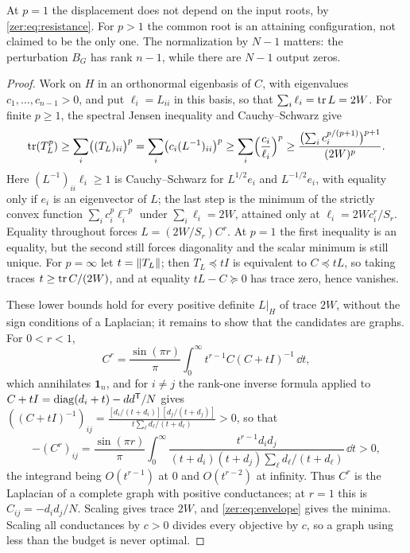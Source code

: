 At $p=1$ the displacement does not depend on the input roots, by \eqref{zer:eq:resistance}. For
$p>1$ the common root is an attaining configuration, not claimed to be the only one. The
normalization by $N-1$ matters: the perturbation $B_G$ has rank $n-1$, while there are $N-1$ output
zeros.

\begin{proof}
Work on $H$ in an orthonormal eigenbasis of $C$, with eigenvalues $c_1,\dots,c_{n-1}>0$, and put
$\ell_i=L_{ii}$ in this basis, so that $\sum_i\ell_i=\operatorname{tr} L=2W$. For finite $p\ge1$, the spectral
Jensen inequality and Cauchy--Schwarz give
\[
 \operatorname{tr}(T_L^p)\ge\sum_i\bigl((T_L)_{ii}\bigr)^p=\sum_i\bigl(c_i(L^{-1})_{ii}\bigr)^p
 \ge\sum_i\Bigl(\frac{c_i}{\ell_i}\Bigr)^p\ge\frac{\bigl(\sum_ic_i^{p/(p+1)}\bigr)^{p+1}}{(2W)^p}.
\]
Here $(L^{-1})_{ii}\ell_i\ge1$ is Cauchy--Schwarz for $L^{1/2}e_i$ and $L^{-1/2}e_i$, with equality
only if $e_i$ is an eigenvector of $L$; the last step is the minimum of the strictly convex function
$\sum_ic_i^p\ell_i^{-p}$ under $\sum_i\ell_i=2W$, attained only at $\ell_i=2Wc_i^r/S_r$. Equality
throughout forces $L=(2W/S_r)C^r$. At $p=1$ the first inequality is an equality, but the second still
forces diagonality and the scalar minimum is still unique. For $p=\infty$ let $t=\lVert T_L\rVert$; then
$T_L\preceq tI$ is equivalent to $C\preceq tL$, so taking traces $t\ge\operatorname{tr} C/(2W)$, and at equality
$tL-C\succeq0$ has trace zero, hence vanishes.

These lower bounds hold for every positive definite $L|_H$ of trace $2W$, without the sign
conditions of a Laplacian; it remains to show that the candidates are graphs. For $0<r<1$,
\[
 C^r=\frac{\sin(\pi r)}\pi\int_0^\infty t^{r-1}C(C+tI)^{-1}\,\dd t ,
\]
which annihilates $\mathbf 1_n$, and for $i\ne j$ the rank-one inverse formula applied to
$C+tI=\operatorname{diag}(d_i+t)-dd^{\mathsf T}/N$ gives
$((C+tI)^{-1})_{ij}=\frac{[d_i/(t+d_i)][d_j/(t+d_j)]}{t\sum_\ell d_\ell/(t+d_\ell)}>0$, so that
\begin{equation}\label{zer:eq:edgeintegral}
 -(C^r)_{ij}=\frac{\sin(\pi r)}\pi\int_0^\infty
 \frac{t^{r-1}d_id_j}{(t+d_i)(t+d_j)\sum_\ell d_\ell/(t+d_\ell)}\,\dd t>0 ,
\end{equation}
the integrand being $O(t^{r-1})$ at $0$ and $O(t^{r-2})$ at infinity. Thus $C^r$ is the Laplacian of
a complete graph with positive conductances; at $r=1$ this is $C_{ij}=-d_id_j/N$. Scaling gives
trace $2W$, and \eqref{zer:eq:envelope} gives the minima. Scaling all conductances by $c>0$ divides
every objective by $c$, so a graph using less than the budget is never optimal.
\end{proof}

